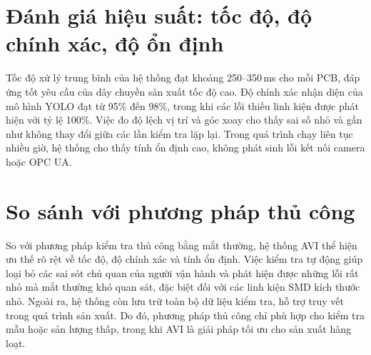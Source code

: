 \section{Đánh giá hiệu suất: tốc độ, độ chính xác, độ ổn định}

Tốc độ xử lý trung bình của hệ thống đạt khoảng 250--350\,ms cho mỗi PCB, đáp ứng tốt yêu cầu của dây chuyền sản xuất tốc độ cao. Độ chính xác nhận diện của mô hình YOLO đạt từ 95\% đến 98\%, trong khi các lỗi thiếu linh kiện được phát hiện với tỷ lệ 100\%. Việc đo độ lệch vị trí và góc xoay cho thấy sai số nhỏ và gần như không thay đổi giữa các lần kiểm tra lặp lại. Trong quá trình chạy liên tục nhiều giờ, hệ thống cho thấy tính ổn định cao, không phát sinh lỗi kết nối camera hoặc OPC UA.

\section{So sánh với phương pháp thủ công}

So với phương pháp kiểm tra thủ công bằng mắt thường, hệ thống AVI thể hiện ưu thế rõ rệt về tốc độ, độ chính xác và tính ổn định. Việc kiểm tra tự động giúp loại bỏ các sai sót chủ quan của người vận hành và phát hiện được những lỗi rất nhỏ mà mắt thường khó quan sát, đặc biệt đối với các linh kiện SMD kích thước nhỏ. Ngoài ra, hệ thống còn lưu trữ toàn bộ dữ liệu kiểm tra, hỗ trợ truy vết trong quá trình sản xuất. Do đó, phương pháp thủ công chỉ phù hợp cho kiểm tra mẫu hoặc sản lượng thấp, trong khi AVI là giải pháp tối ưu cho sản xuất hàng loạt.
